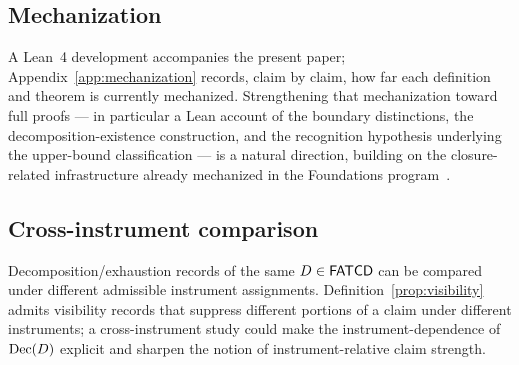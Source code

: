 \subsection{Mechanization}\label{subsec:future-mechanization}

A Lean~4 development accompanies the present paper;
Appendix~\ref{app:mechanization} records, claim by claim, how far each definition
and theorem is currently mechanized. Strengthening that mechanization toward full
proofs --- in particular a Lean account of the boundary distinctions, the
decomposition-existence construction, and the recognition hypothesis underlying
the upper-bound classification --- is a natural direction, building on the
closure-related infrastructure already mechanized in the Foundations
program~\citep{Tsiokos2026SixBirdsFoundations,DeMouraUllrich2021}.

\subsection{Cross-instrument comparison}\label{subsec:future-cross-instrument}

Decomposition/exhaustion records of the same \(D \in \mathsf{FATCD}{}\) can
be compared under different admissible instrument assignments.
Definition~\ref{prop:visibility} admits visibility records that
suppress different portions of a claim under different instruments; a
cross-instrument study could make the instrument-dependence of
\(\operatorname{Dec}\!\left(D\right)\) explicit and sharpen the notion of instrument-relative
claim strength.
